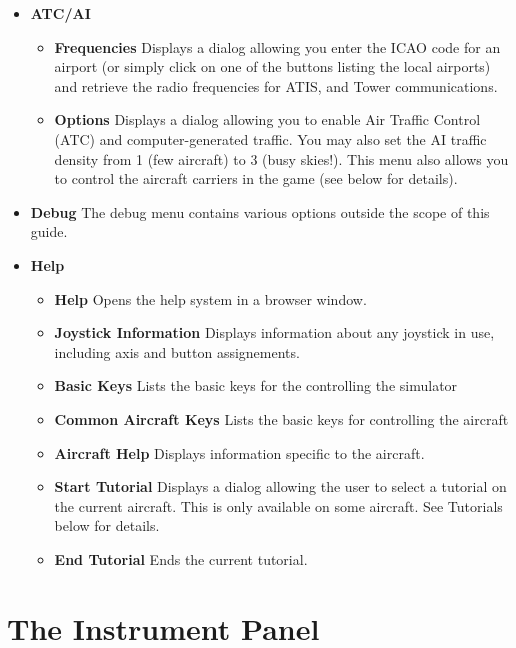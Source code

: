 \begin{itemize}
\item \textbf{ATC/AI} 
 \begin{itemize}
  \item \textbf{Frequencies}  Displays a dialog allowing you enter the ICAO code
for an airport 
  (or simply click on one of the buttons listing the local airports) and
retrieve the radio 
  frequencies for ATIS, and Tower communications.
  \item \textbf{Options}  Displays a dialog allowing you to enable Air Traffic
Control (ATC) and 
  computer-generated traffic. You may also set the AI traffic density from 1
(few aircraft) to 3 (busy skies!). 
  This menu also allows you to control the aircraft carriers in the game (see
below for details).
 \end{itemize}
   
\item \textbf{Debug} The debug menu contains various options
outside the scope of this guide.
 
 \item \textbf{Help}
 \begin{itemize}
 \item \textbf{Help} Opens the help system in a browser window.
 \item \textbf{Joystick Information} Displays information about any joystick 
 in use, including axis and button assignements.  
 \item \textbf{Basic Keys} Lists the basic keys for the controlling the
simulator
 \item \textbf{Common Aircraft Keys} Lists the basic keys for controlling the
aircraft 
 \item \textbf{Aircraft Help} Displays information specific to the aircraft.
 \item \textbf{Start Tutorial} Displays a dialog allowing the user to select a
tutorial on the current aircraft. 
 This is only available on some aircraft. See Tutorials below for details.
 \item \textbf{End Tutorial}  Ends the current tutorial.
 \end{itemize}
\end{itemize}

\section{The Instrument Panel}

